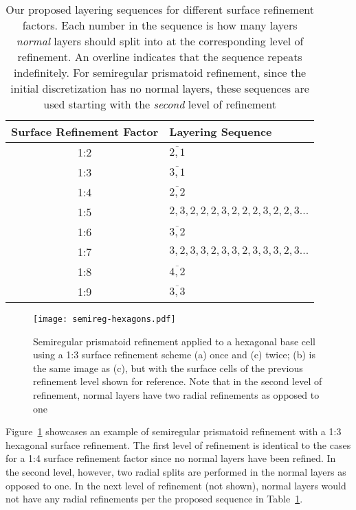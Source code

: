 \begin{table}[ht!]
	\centering
	\caption[Layering sequences for different surface refinement factors]{
		Our proposed layering sequences for different surface refinement factors.
		Each number in the sequence is how many layers \textit{normal} layers should split into at the corresponding level of refinement.
		An overline indicates that the sequence repeats indefinitely.
		For semiregular prismatoid refinement, since the initial discretization has no normal layers, these sequences are used starting with the \textit{second} level of refinement
	}
	\begin{tabular}{@{} c l @{}}
		\toprule
		Surface Refinement Factor & Layering Sequence         \\ \midrule
		1:2                  & $\overline{2,1}$               \\
		1:3                  & $\overline{3,1}$               \\
		1:4                  & $\overline{2,2}$               \\
		1:5                  & $2,3,2,2,2,3,2,2,2,3,2,2,3...$ \\
		1:6                  & $\overline{3,2}$               \\
		1:7                  & $3,2,3,3,2,3,3,2,3,3,3,2,3...$ \\
		1:8                  & $\overline{4,2}$               \\
		1:9                  & $\overline{3,3}$               \\ \bottomrule
	\end{tabular}
	\label{tab:layers}
\end{table}


\begin{figure}[ht!]
	\centering
	\texttt{[image: semireg-hexagons.pdf]}
	\caption[Semiregular prismatoid refinement for hexagons]{
		Semiregular prismatoid refinement applied to a hexagonal base cell using a 1:3 surface refinement scheme (a) once and (c) twice; (b) is the same image as (c), but with the surface cells of the previous refinement level shown for reference.
		Note that in the second level of refinement, normal layers have two radial refinements as opposed to one
	}
	\label{fig:hexagons}
\end{figure}


Figure~\ref{fig:hexagons} showcases an example of semiregular prismatoid refinement with a 1:3 hexagonal surface refinement.
The first level of refinement is identical to the cases for a 1:4 surface refinement factor since no normal layers have been refined.
In the second level, however, two radial splits are performed in the normal layers as opposed to one.
In the next level of refinement (not shown), normal layers would not have any radial refinements per the proposed sequence in Table~\ref{tab:layers}.


